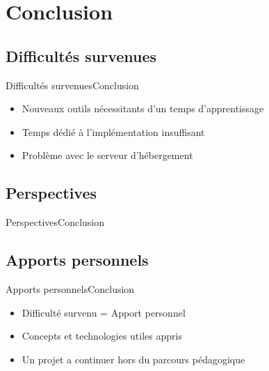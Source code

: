 \documentclass[usenames,dvipsnames]{beamer}
\begin{document}
\section{Conclusion}
\subsection{Difficultés survenues}
\begin{frame}{Difficultés survenues}{Conclusion}
    \begin{itemize}
      \item Nouveaux outils nécessitants d'un temps d'apprentissage
      \item Temps dédié à l'implémentation insuffisant
      \item Problème avec le serveur d'hébergement
    \end{itemize}
\end{frame}

\subsection{Perspectives}
\begin{frame}{Perspectives}{Conclusion}

\end{frame}


\subsection{Apports personnels}
\begin{frame}{Apports personnels}{Conclusion}
    \begin{itemize}
      \item Difficulté survenu = Apport personnel
      \item Concepts et technologies utiles appris
      \item Un projet a continuer hors du parcours pédagogique
    \end{itemize}
\end{frame}
\end{document}
